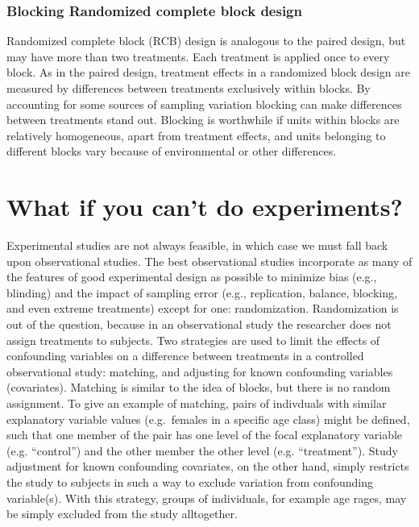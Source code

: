 \documentclass[]{book}
\begin{document}
\hypertarget{blocking-randomized-complete-block-design}{%
\subsubsection{Blocking \textbar{} Randomized complete block design}\label{blocking-randomized-complete-block-design}}

Randomized complete block (RCB) design is analogous to the paired design, but may have more than two treatments. Each treatment is applied once to every block. As in the paired design, treatment effects in a randomized block design are measured by differences between treatments exclusively within blocks. By accounting for some sources of sampling variation blocking can make differences between treatments stand out. Blocking is worthwhile if units within blocks are relatively homogeneous, apart from treatment effects, and units belonging to different blocks vary because of environmental or other differences.

\hypertarget{what-if-you-cant-do-experiments}{%
\section{What if you can't do experiments?}\label{what-if-you-cant-do-experiments}}

Experimental studies are not always feasible, in which case we must fall back upon observational studies. The best observational studies incorporate as many of the features of good experimental design as possible to minimize bias (e.g., blinding) and the impact of sampling error (e.g., replication, balance, blocking, and even extreme treatments) except for one: randomization. Randomization is out of the question, because in an observational study the researcher does not assign treatments to subjects. Two strategies are used to limit the effects of confounding variables on a difference between treatments in a controlled observational study: matching, and adjusting for known confounding variables (covariates). Matching is similar to the idea of blocks, but there is no random assignment. To give an example of matching, pairs of indivduals with similar explanatory variable values (e.g.~females in a specific age class) might be defined, such that one member of the pair has one level of the focal explanatory variable (e.g. ``control'') and the other member the other level (e.g. ``treatment''). Study adjustment for known confounding covariates, on the other hand, simply restricts the study to subjects in such a way to exclude variation from confounding variable(s). With this strategy, groups of individuals, for example age rages, may be simply excluded from the study alltogether.
\end{document}
